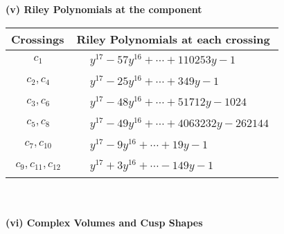 \documentclass[1p]{elsarticle_modified}
\theoremstyle{definition}
\begin{document}
\newpage\renewcommand{\arraystretch}{1}
\flushleft \textbf{(v) Riley Polynomials at the component}\newline \\
\begin{tabular}{m{50pt}|m{274pt}}
Crossings & \hspace{64pt}Riley Polynomials at each crossing \\
\hline $$\begin{aligned}c_{1}\end{aligned}$$&$\begin{aligned}
&y^{17}-57 y^{16}+\cdots+110253 y-1
\end{aligned}$\\
\hline $$\begin{aligned}c_{2},c_{4}\end{aligned}$$&$\begin{aligned}
&y^{17}-25 y^{16}+\cdots+349 y-1
\end{aligned}$\\
\hline $$\begin{aligned}c_{3},c_{6}\end{aligned}$$&$\begin{aligned}
&y^{17}-48 y^{16}+\cdots+51712 y-1024
\end{aligned}$\\
\hline $$\begin{aligned}c_{5},c_{8}\end{aligned}$$&$\begin{aligned}
&y^{17}-49 y^{16}+\cdots+4063232 y-262144
\end{aligned}$\\
\hline $$\begin{aligned}c_{7},c_{10}\end{aligned}$$&$\begin{aligned}
&y^{17}-9 y^{16}+\cdots+19 y-1
\end{aligned}$\\
\hline $$\begin{aligned}c_{9},c_{11},c_{12}\end{aligned}$$&$\begin{aligned}
&y^{17}+3 y^{16}+\cdots-149 y-1
\end{aligned}$\\
\hline
\end{tabular}\\~\\
\newpage\flushleft \textbf{(vi) Complex Volumes and Cusp Shapes}
\end{document}
